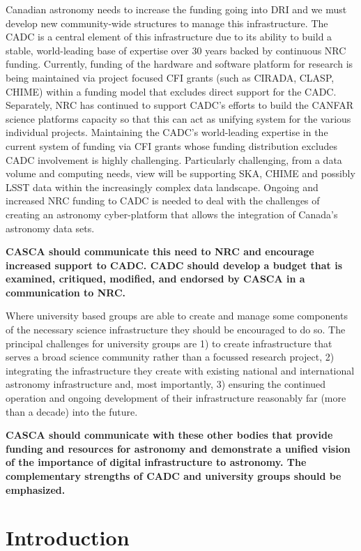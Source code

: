 \documentclass[11pt]{article}
\begin{document}
Canadian astronomy needs to increase the funding going into DRI and we must develop new community-wide structures to manage this infrastructure. The CADC is a central element of this infrastructure due to its ability to build a stable, world-leading base of expertise over 30 years backed by continuous NRC funding. 
Currently, funding of the hardware and software platform for research is being maintained via project focused CFI grants (such as CIRADA, CLASP, CHIME) within a funding model that excludes direct support for the CADC.  Separately, NRC has continued to support CADC's efforts to build the CANFAR science platforms capacity so that this can act as unifying system for the various individual projects.
Maintaining the CADC's world-leading expertise in the current system of funding via CFI grants whose funding distribution excludes CADC involvement is highly challenging.   Particularly challenging, from a data volume and computing needs, view will be supporting SKA, CHIME and possibly LSST data  within the increasingly complex data landscape. 
Ongoing and increased NRC funding to CADC is needed to deal with the challenges of creating an astronomy cyber-platform that allows the integration of Canada's astronomy data sets. 

{\bf CASCA should communicate this need to NRC and encourage increased support to CADC. CADC should develop a budget that is examined, critiqued, modified, and endorsed by CASCA in a communication to NRC.}

Where university based groups are able to create and manage some components of the necessary science infrastructure they should be encouraged to do so. The principal challenges for university groups are 1) to create infrastructure that serves a broad science community rather than a focussed research project, 2) integrating the infrastructure they create with existing national and international astronomy infrastructure and, most importantly, 3) ensuring the continued operation and ongoing development of their infrastructure reasonably far (more than a decade) into the future.

{\bf CASCA should communicate with these other bodies that provide funding and resources for astronomy and demonstrate a unified vision of the importance of digital infrastructure to astronomy. The complementary strengths of CADC and university groups should be emphasized.}

\section{Introduction}
\end{document}
